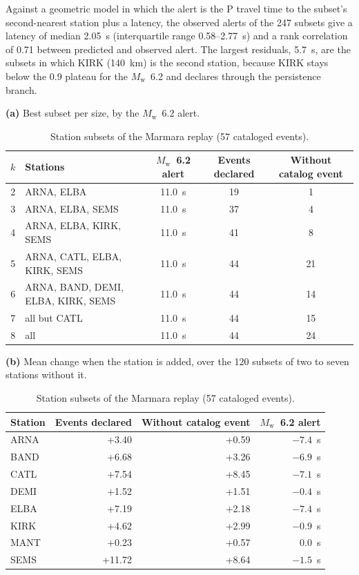 \documentclass[11pt,a4paper]{article}
\newcommand{\Mw}{$M_\mathrm{w}$}
\newcommand{\panel}[1]{\par\smallskip\noindent\textbf{(#1)}\enskip}
\begin{document}
Against a geometric model in which the alert is the P travel time to the
subset's second-nearest station plus a latency, the observed alerts of the 247
subsets give a latency of median 2.05~s (interquartile range 0.58--2.77~s) and
a rank correlation of 0.71 between predicted and observed alert. The largest
residuals, 5.7~s, are the subsets in which KIRK (140~km) is the second station, because KIRK stays below the 0.9 plateau for the \Mw{}~6.2 and declares through the persistence branch.

\begin{table}[htbp]
  \centering\footnotesize\setlength{\tabcolsep}{4pt}
  \caption{Station subsets of the Marmara replay (57 cataloged events).}\label{t:subsets}
  \panel{a} Best subset per size, by the \Mw{}~6.2 alert.\par\smallskip
  \begin{tabular}{@{}rlccc@{}}
    \toprule
    $k$ & Stations & \Mw{}~6.2 alert & Events declared & Without catalog event \\
    \midrule
    2 & ARNA, ELBA & 11.0~s & 19 & 1 \\
    3 & ARNA, ELBA, SEMS & 11.0~s & 37 & 4 \\
    4 & ARNA, ELBA, KIRK, SEMS & 11.0~s & 41 & 8 \\
    5 & ARNA, CATL, ELBA, KIRK, SEMS & 11.0~s & 44 & 21 \\
    6 & ARNA, BAND, DEMI, ELBA, KIRK, SEMS & 11.0~s & 44 & 14 \\
    7 & all but CATL & 11.0~s & 44 & 15 \\
    8 & all & 11.0~s & 44 & 24 \\
    \bottomrule
  \end{tabular}

  \bigskip
  \panel{b} Mean change when the station is added, over the 120 subsets of two to
  seven stations without it.\par\smallskip
  \begin{tabular}{@{}lrrr@{}}
    \toprule
    Station & Events declared & Without catalog event & \Mw{}~6.2 alert \\
    \midrule
    ARNA & +3.40 & +0.59 & $-7.4$~s \\
    BAND & +6.68 & +3.26 & $-6.9$~s \\
    CATL & +7.54 & +8.45 & $-7.1$~s \\
    DEMI & +1.52 & +1.51 & $-0.4$~s \\
    ELBA & +7.19 & +2.18 & $-7.4$~s \\
    KIRK & +4.62 & +2.99 & $-0.9$~s \\
    MANT & +0.23 & +0.57 & 0.0~s \\
    SEMS & +11.72 & +8.64 & $-1.5$~s \\
    \bottomrule
  \end{tabular}
\end{table}
\end{document}
